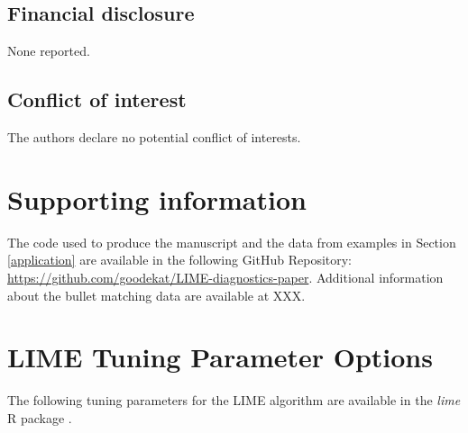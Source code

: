 \documentclass[AMS,STIX2COL]{WileyNJD-v2}\usepackage[]{graphicx}\usepackage[]{color}
\begin{document}
\subsection*{Financial disclosure}

None reported.

\subsection*{Conflict of interest}

The authors declare no potential conflict of interests.

\section*{Supporting information}

The code used to produce the manuscript and the data from examples in Section \ref{application} are available in the following GitHub Repository: \href{https://github.com/goodekat/LIME-diagnostics-paper}{https://github.com/goodekat/LIME-diagnostics-paper}. Additional information about the bullet matching data are available at XXX.



\newpage

\appendix

\section{LIME Tuning Parameter Options} \label{lime-details}

The following tuning parameters for the LIME algorithm are available in the \emph{lime} R package \citep{pedersen:2020}.
\end{document}
